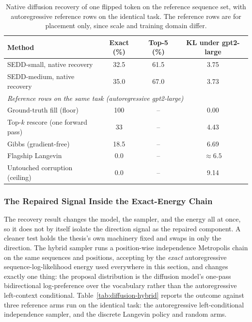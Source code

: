 \begin{table}[h]
    \centering
    \small
    \setlength{\tabcolsep}{4pt}
    \begin{tabular}{lccc}
        \toprule
        Method & Exact (\%) & Top-5 (\%) & KL under gpt2-large \\
        \midrule
        SEDD-small, native recovery & 32.5 & 61.5 & 3.75 \\
        SEDD-medium, native recovery & 35.0 & 67.0 & 3.73 \\
        \midrule
        \multicolumn{4}{l}{\emph{Reference rows on the same task (autoregressive gpt2-large)}} \\
        Ground-truth fill (floor) & 100 & -- & 0.00 \\
        Top-$k$ rescore (one forward pass) & 33 & -- & 4.43 \\
        Gibbs (gradient-free) & 18.5 & -- & 6.69 \\
        Flagship Langevin & 0.0 & -- & $\approx 6.5$ \\
        Untouched corruption (ceiling) & 0.0 & -- & 9.14 \\
        \bottomrule
    \end{tabular}
    \caption[Native diffusion recovery of one flipped token.]{Native diffusion recovery of one flipped token on the reference sequence set, with autoregressive reference rows on the identical task. The reference rows are for placement only, since scale and training domain differ.}
    \label{tab:diffusion-recovery}
\end{table}

\subsubsection{The Repaired Signal Inside the Exact-Energy Chain}
\label{sec:results-diffusion-hybrid}

The recovery result changes the model, the sampler, and the energy all at once, so it does not by itself isolate the direction signal as the repaired component. A cleaner test holds the thesis's own machinery fixed and swaps in only the direction. The hybrid sampler runs a position-wise independence Metropolis chain on the same sequences and positions, accepting by the \emph{exact} autoregressive sequence-log-likelihood energy used everywhere in this section, and changes exactly one thing: the proposal distribution is the diffusion model's one-pass bidirectional log-preference over the vocabulary rather than the autoregressive left-context conditional. Table~\ref{tab:diffusion-hybrid} reports the outcome against three reference arms run on the identical task: the autoregressive left-conditional independence sampler, and the discrete Langevin policy and random arms.

